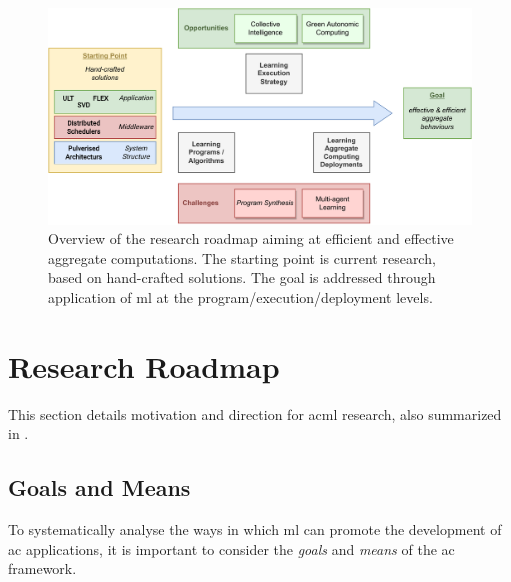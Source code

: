\begin{figure}[h]
  \includegraphics[width=\linewidth]{papers/discoli/img/roadmap.pdf}
  \caption[Overview of the research roadmap for combined aggregate computing with machine learning]{Overview of the research roadmap aiming at efficient and effective aggregate computations. 
  The starting point is current research, based on hand-crafted solutions.
  The goal is addressed through application of \ac{ml} at the program/execution/deployment levels.}
  \label{fig:roadmap}
\end{figure}

\section{Research Roadmap}\label{s:roadmap}

This section details motivation and direction for \ac{acml} research,
 also summarized in .
%

\subsection{Goals and Means}

To systematically analyse the 
 ways in which \ac{ml}
 can promote the development of 
 \ac{ac} applications, 
 it is important to 
 consider the \emph{goals} and \emph{means}
 of the \ac{ac} framework.
%

